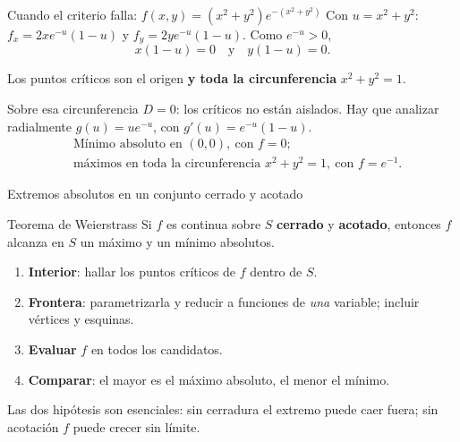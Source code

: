 \documentclass[11pt,aspectratio=169]{beamer}
\begin{document}
\begin{frame}{Cuando el criterio falla: $f(x,y)=(x^2+y^2)e^{-(x^2+y^2)}$}
  Con $u=x^2+y^2$: $f_x=2xe^{-u}(1-u)$ y $f_y=2ye^{-u}(1-u)$. Como $e^{-u}>0$,
  \[
    x(1-u)=0 \quad\text{y}\quad y(1-u)=0.
  \]
  \pause
  \begin{center}\normalsize\color{brick} Los puntos críticos son el origen \textbf{y toda la circunferencia} $x^2+y^2=1$.\end{center}
  \pause
  \vspace{4pt}
  Sobre esa circunferencia $D=0$: los críticos no están aislados. Hay que analizar radialmente $g(u)=ue^{-u}$, con $g'(u)=e^{-u}(1-u)$.
  \pause
  \[
    \boxed{\begin{aligned}
      &\text{Mínimo absoluto en }(0,0),\ \text{con } f=0;\\
      &\text{máximos en toda la circunferencia } x^2+y^2=1,\ \text{con } f=e^{-1}.
    \end{aligned}}
  \]
  \pause
\end{frame}

\begin{frame}{Extremos absolutos en un conjunto cerrado y acotado}
  \begin{block}{Teorema de Weierstrass}
    Si $f$ es continua sobre $S$ \textbf{cerrado} y \textbf{acotado}, entonces $f$ alcanza en $S$ un máximo y un mínimo absolutos.
  \end{block}
  \pause
  \vspace{4pt}
  \begin{enumerate}
    \item \textbf{Interior}: hallar los puntos críticos de $f$ dentro de $S$.
    \pause
    \item \textbf{Frontera}: parametrizarla y reducir a funciones de \emph{una} variable; incluir vértices y esquinas.
    \pause
    \item \textbf{Evaluar} $f$ en todos los candidatos.
    \pause
    \item \textbf{Comparar}: el mayor es el máximo absoluto, el menor el mínimo.
  \end{enumerate}
  \vspace{6pt}
  \pause
  \begin{center}\small\color{gray60} Las dos hipótesis son esenciales: sin cerradura el extremo puede caer fuera; sin acotación $f$ puede crecer sin límite.\end{center}
\end{frame}
\end{document}
